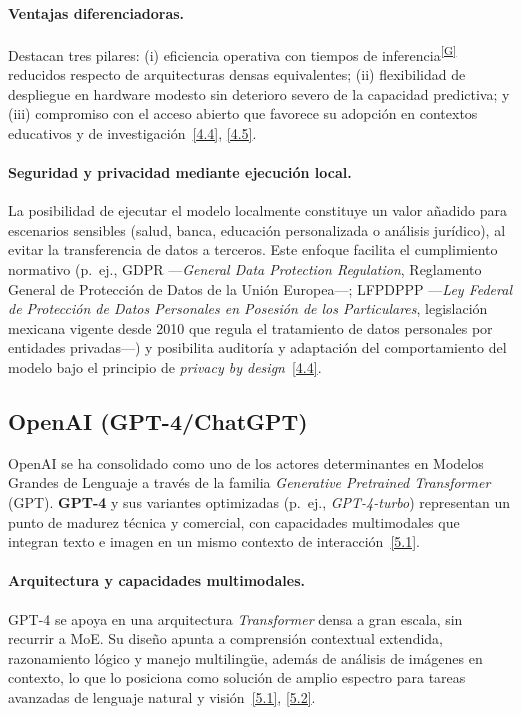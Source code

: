\documentclass[12pt,a4paper]{report}
\numberwithin{figure}{section}
\begin{document}
\paragraph{Ventajas diferenciadoras.}
Destacan tres pilares: (i) eficiencia operativa con tiempos de inferencia\textsuperscript{\hyperref[glos:inferencia]{[G]}} reducidos respecto de arquitecturas densas equivalentes; (ii) flexibilidad de despliegue en hardware modesto sin deterioro severo de la capacidad predictiva; y (iii) compromiso con el acceso abierto que favorece su adopción en contextos educativos y de investigación~\hyperref[ref:4.4]{[4.4]}, \hyperref[ref:4.5]{[4.5]}.

\paragraph{Seguridad y privacidad mediante ejecución local.}
La posibilidad de ejecutar el modelo localmente constituye un valor añadido para escenarios sensibles (salud, banca, educación personalizada o análisis jurídico), al evitar la transferencia de datos a terceros. Este enfoque facilita el cumplimiento normativo (p.~ej., GDPR ---\textit{General Data Protection Regulation}, Reglamento General de Protección de Datos de la Unión Europea---; LFPDPPP ---\textit{Ley Federal de Protección de Datos Personales en Posesión de los Particulares}, legislación mexicana vigente desde 2010 que regula el tratamiento de datos personales por entidades privadas---) y posibilita auditoría y adaptación del comportamiento del modelo bajo el principio de \textit{privacy by design}~\hyperref[ref:4.4]{[4.4]}.

\subsection{OpenAI (GPT-4/ChatGPT)}
\label{subsec:openai_gpt4}

OpenAI se ha consolidado como uno de los actores determinantes en Modelos Grandes de Lenguaje a través de la familia \textit{Generative Pretrained Transformer} (GPT). \textbf{GPT-4} y sus variantes optimizadas (p.~ej., \textit{GPT-4-turbo}) representan un punto de madurez técnica y comercial, con capacidades multimodales que integran texto e imagen en un mismo contexto de interacción~\hyperref[ref:5.1]{[5.1]}.

\paragraph{Arquitectura y capacidades multimodales.}
GPT-4 se apoya en una arquitectura \textit{Transformer} densa a gran escala, sin recurrir a MoE. Su diseño apunta a comprensión contextual extendida, razonamiento lógico y manejo multilingüe, además de análisis de imágenes en contexto, lo que lo posiciona como solución de amplio espectro para tareas avanzadas de lenguaje natural y visión~\hyperref[ref:5.1]{[5.1]}, \hyperref[ref:5.2]{[5.2]}.
\end{document}
